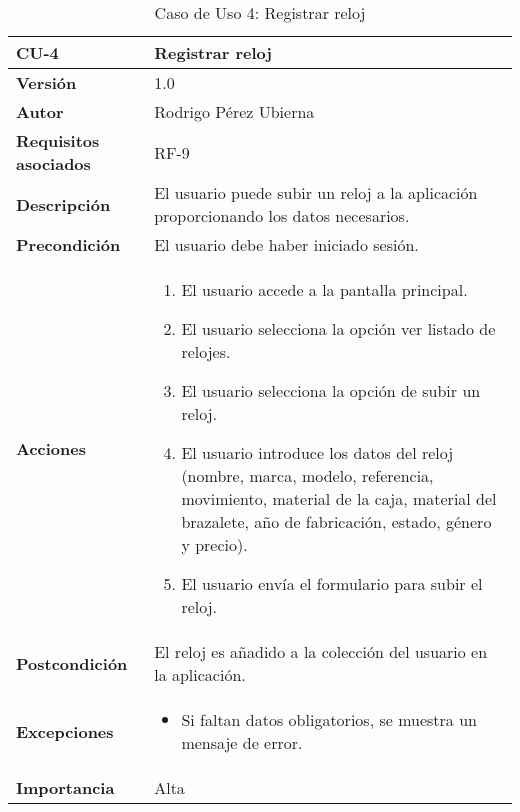 \begin{table}[p]
	\centering
	\begin{tabularx}{\linewidth}{ p{} p{} }
		\toprule
		\textbf{CU-4} & \textbf{Registrar reloj}\\
		\toprule
		\textbf{Versión} & 1.0 \\
		\textbf{Autor} & Rodrigo Pérez Ubierna \\
		\textbf{Requisitos asociados} & RF-9 \\
		\textbf{Descripción} & El usuario puede subir un reloj a la aplicación proporcionando los datos necesarios. \\
		\textbf{Precondición} & El usuario debe haber iniciado sesión. \\
		\textbf{Acciones} &
		\begin{enumerate}
			\def\labelenumi{\arabic{enumi}.}
			\tightlist
			\item El usuario accede a la pantalla principal.
			\item El usuario selecciona la opción ver listado de relojes.
			\item El usuario selecciona la opción de subir un reloj.
			\item El usuario introduce los datos del reloj (nombre, marca, modelo, referencia, movimiento, material de la caja, material del brazalete, año de fabricación, estado, género y precio).
			\item El usuario envía el formulario para subir el reloj.
		\end{enumerate}\\
		\textbf{Postcondición} & El reloj es añadido a la colección del usuario en la aplicación.\\
		\textbf{Excepciones} &
			\begin{itemize}
				\item Si faltan datos obligatorios, se muestra un mensaje de error.
			\end{itemize} \\
		\textbf{Importancia} & Alta \\
		\bottomrule
	\end{tabularx}
	\caption{Caso de Uso 4: Registrar reloj}
\end{table}

